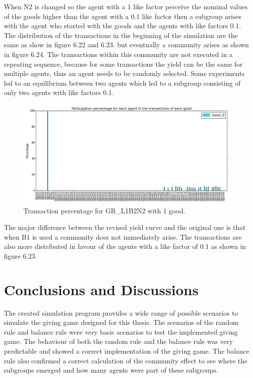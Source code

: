 \documentclass[twoside,openright]{uva-bachelor-thesis}
\begin{document}
\begin{description}
When N2 is changed so the agent with a 1 like factor perceive the nominal values of the goods higher than the agent with a 0.1 like factor then a subgroup arises with the agent who started with the goods and the agents with like factors 0.1. The distribution of the transactions in the beginning of the simulation are the same as show in figure 6.22 and 6.23, but eventually a community arises as shown in figure 6.24. The transactions within this community are not executed in a repeating sequence, because for some transactions the yield can be the same for multiple agents, thus an agent needs to be randomly selected. Some experiments led to an equilibrium between two agents which led to a subgroup consisting of only two agents with like factors 0.1.
\begin{figure}[h!]
\centering
\includegraphics[scale=0.4]{Simulation2_figures/GR_L1B2N2_321_4k} 
\caption{Transaction percentage for GR\_L1B2N2 with 1 good.}
\end{figure}

\end{description}

The major difference between the revised yield curve and the original one is that when B1 is used a community does not immediately arise. The transactions are also more distributed in favour of the agents with a like factor of 0.1 as shown in figure 6.23. 










\chapter{Conclusions and Discussions}
The created simulation program provides a wide range of possible scenarios to simulate the giving game designed for this thesis. The scenarios of the random rule and balance rule were very basic scenarios to test the implemented giving game. The behaviour of both the random rule and the balance rule was very predictable and showed a correct implementation of the giving game. The balance rule also confirmed a correct calculation of the community effect to see where the subgroups emerged and how many agents were part of these subgroups.
\end{document}

